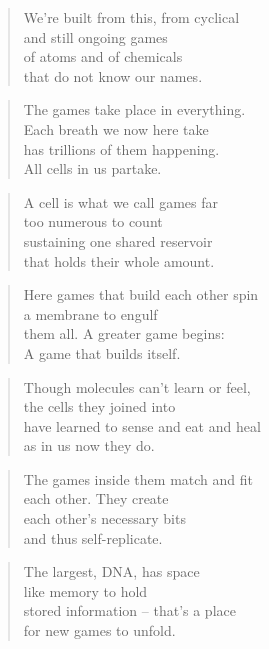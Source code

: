 \documentclass[10pt,a4paper]{article}
\begin{document}
\begin{paracol}{2}
\begin{verse}
We’re built from this, from cyclical\\
and still ongoing games\\
of atoms and of chemicals\\
that do not know our names.
\end{verse}

\begin{verse}
The games take place in everything.\\
Each breath we now here take\\
has trillions of them happening.\\
All cells in us partake.
\end{verse}

\begin{verse}
A cell is what we call games far\\
too numerous to count\\
sustaining one shared reservoir\\
that holds their whole amount.
\end{verse}

\begin{verse}
Here games that build each other spin\\
a membrane to engulf\\
them all. A greater game begins:\\
A game that builds itself.
\end{verse}

\begin{verse}
Though molecules can’t learn or feel,\\
the cells they joined into\\
have learned to sense and eat and heal\\
as in us now they do.
\end{verse}

\begin{verse}
The games inside them match and fit\\
each other. They create\\
each other’s necessary bits\\
and thus self-replicate.
\end{verse}

\begin{verse}
The largest, DNA, has space\\
like memory to hold\\
stored information – that’s a place\\
for new games to unfold.
\end{verse}


\end{paracol}
\end{document}
